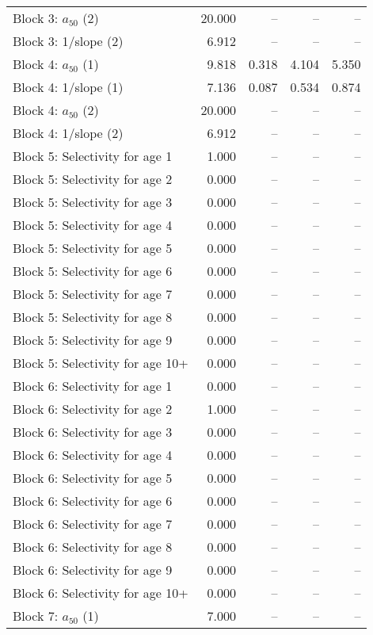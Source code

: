 \documentclass[
]{article}
\begin{document}
\begin{landscape}
\begin{longtable}[t]{lrrrr}
\addlinespace
Block 3: $a_{50}$ (2) & 20.000 & -- & -- & --\\
Block 3: 1/slope (2) & 6.912 & -- & -- & --\\
Block 4: $a_{50}$ (1) & 9.818 & 0.318 & 4.104 & 5.350\\
Block 4: 1/slope (1) & 7.136 & 0.087 & 0.534 & 0.874\\
Block 4: $a_{50}$ (2) & 20.000 & -- & -- & --\\
\addlinespace
Block 4: 1/slope (2) & 6.912 & -- & -- & --\\
Block 5: Selectivity for age 1 & 1.000 & -- & -- & --\\
Block 5: Selectivity for age 2 & 0.000 & -- & -- & --\\
Block 5: Selectivity for age 3 & 0.000 & -- & -- & --\\
Block 5: Selectivity for age 4 & 0.000 & -- & -- & --\\
\addlinespace
Block 5: Selectivity for age 5 & 0.000 & -- & -- & --\\
Block 5: Selectivity for age 6 & 0.000 & -- & -- & --\\
Block 5: Selectivity for age 7 & 0.000 & -- & -- & --\\
Block 5: Selectivity for age 8 & 0.000 & -- & -- & --\\
Block 5: Selectivity for age 9 & 0.000 & -- & -- & --\\
\addlinespace
Block 5: Selectivity for age 10+ & 0.000 & -- & -- & --\\
Block 6: Selectivity for age 1 & 0.000 & -- & -- & --\\
Block 6: Selectivity for age 2 & 1.000 & -- & -- & --\\
Block 6: Selectivity for age 3 & 0.000 & -- & -- & --\\
Block 6: Selectivity for age 4 & 0.000 & -- & -- & --\\
\addlinespace
Block 6: Selectivity for age 5 & 0.000 & -- & -- & --\\
Block 6: Selectivity for age 6 & 0.000 & -- & -- & --\\
Block 6: Selectivity for age 7 & 0.000 & -- & -- & --\\
Block 6: Selectivity for age 8 & 0.000 & -- & -- & --\\
Block 6: Selectivity for age 9 & 0.000 & -- & -- & --\\
\addlinespace
Block 6: Selectivity for age 10+ & 0.000 & -- & -- & --\\
Block 7: $a_{50}$ (1) & 7.000 & -- & -- & --\\

\end{longtable}
\end{landscape}
\end{document}
